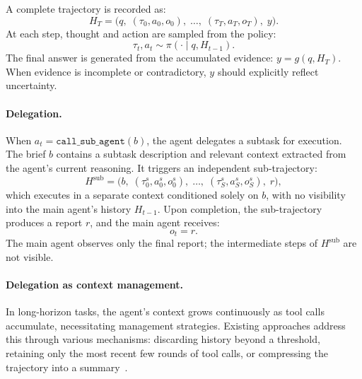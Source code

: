 \documentclass{llmxive}
\begin{document}
A complete trajectory is recorded as:
\begin{equation}
H_T = \bigl(q,\; (\tau_0, a_0, o_0),\; \ldots,\; (\tau_T, a_T, o_T),\; y\bigr).
\end{equation}
At each step, thought and action are sampled from the policy:
\begin{equation}
\tau_t, a_t \sim \pi(\cdot \mid q, H_{t-1}).
\end{equation}
The final answer is generated from the accumulated evidence: $y = g(q, H_T)$. When evidence is incomplete or contradictory, $y$ should explicitly reflect uncertainty.

\paragraph{Delegation.}
When $a_t = \texttt{call\_sub\_agent}(b)$, the agent delegates a subtask for execution. The brief $b$ contains a subtask description and relevant context extracted from the agent's current reasoning. It triggers an independent sub-trajectory:
\begin{equation}
H^{\text{sub}} = \bigl(b,\; (\tau_0^s, a_0^s, o_0^s),\; \ldots,\; (\tau_S^s, a_S^s, o_S^s),\; r\bigr),
\end{equation}
which executes in a separate context conditioned solely on $b$, with no visibility into the main agent's history $H_{t-1}$. Upon completion, the sub-trajectory produces a report $r$, and the main agent receives:
\begin{equation}
o_t = r.
\end{equation}
The main agent observes only the final report; the intermediate steps of $H^{\text{sub}}$ are not visible.

\paragraph{Delegation as context management.}
In long-horizon tasks, the agent's context grows continuously as tool calls accumulate, necessitating management strategies. Existing approaches address this through various mechanisms: discarding history beyond a threshold, retaining only the most recent few rounds of tool calls, or compressing the trajectory into a summary~\citep{liu2025deepseek, zeng2026glm, team2026mirothinker}.
\end{document}
